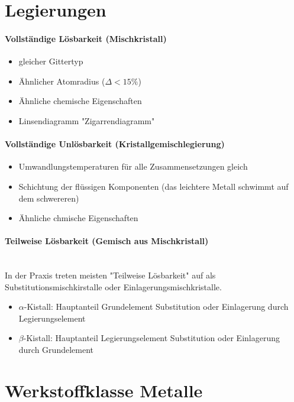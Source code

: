 \documentclass[12pt,twocolumn]{article}
\begin{document}
    \section*{Legierungen}
    \paragraph{Vollständige Lösbarkeit (Mischkristall)}\mbox{}
    \begin{itemize}[label={}, leftmargin=*,  itemsep=0.01em]
        \item gleicher Gittertyp
        \item Ähnlicher Atomradius ($\Delta < 15\%$)
        \item Ähnliche chemische Eigenschaften
        \item Linsendiagramm "Zigarrendiagramm"
    \end{itemize}
    \paragraph{Vollständige Unlösbarkeit (Kristallgemischlegierung)}\mbox{}
    \begin{itemize}[label={}, leftmargin=*,  itemsep=0.01em]
        \item Umwandlungstemperaturen für alle Zusammensetzungen gleich
        \item Schichtung der flüssigen Komponenten (das leichtere Metall schwimmt auf dem
        schwereren)
        \item Ähnliche chmische Eigenschaften
    \end{itemize}
    \paragraph{Teilweise Lösbarkeit (Gemisch aus Mischkristall)}\mbox{}\\
    In der Praxis treten meisten "Teilweise Lösbarkeit" auf als Substitutionsmischkirstalle oder Einlagerungsmischkristalle.
    \begin{itemize}[label={}, leftmargin=*, itemsep=0.01em]
        \item $\alpha$-Kistall: Hauptanteil Grundelement Substitution oder Einlagerung durch Legierungselement
        \item $\beta$-Kistall: Hauptanteil Legierungselement Substitution oder Einlagerung durch Grundelement
    \end{itemize}
    \section{Werkstoffklasse Metalle}
\end{document}
